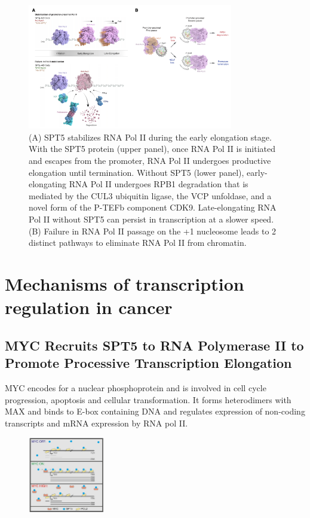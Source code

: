 \begin{figure}
\centering
\includegraphics[width=0.8\textwidth]{../_resources/Screen_Shot_2022-12-19_at_17-00-41.png}
\caption{(A) SPT5 stabilizes RNA Pol II during the early elongation stage. With the SPT5 protein (upper panel), once RNA Pol II is initiated and escapes from the promoter, RNA Pol II undergoes productive elongation until termination. Without SPT5 (lower panel), early-elongating RNA Pol II undergoes RPB1 degradation that is mediated by the CUL3 ubiquitin ligase, the VCP unfoldase, and a novel form of the P-TEFb component CDK9. Late-elongating RNA Pol II without SPT5 can persist in transcription at a slower speed.
(B) Failure in RNA Pol II passage on the +1 nucleosome leads to 2 distinct pathways to eliminate RNA Pol II from chromatin.}
\end{figure}

\section{Mechanisms of transcription regulation in cancer}

\subsection{MYC Recruits SPT5 to RNA Polymerase II to Promote Processive Transcription Elongation}

MYC encodes for a nuclear phosphoprotein and is involved in cell cycle progression, apoptosis and cellular transformation. It forms heterodimers with MAX and binds to E-box containing DNA and regulates expression of non-coding transcripts and mRNA expression by RNA pol II.

\begin{figure}
\centering
\includegraphics[width=0.3\textwidth]{../_resources/Screenshot_2022-10-28_at_10-37-23.png}
\caption{}
\end{figure}

